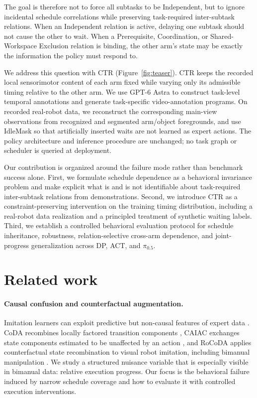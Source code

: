 \documentclass{article}
\newcommand{\method}{CTR}
\begin{document}
The goal is therefore not to force all subtasks to be Independent, but to ignore incidental schedule correlations while preserving task-required inter-subtask relations. When an Independent relation is active, delaying one subtask should not cause the other to wait. When a Prerequisite, Coordination, or Shared-Workspace Exclusion relation is binding, the other arm's state may be exactly the information the policy must respond to.

We address this question with \method{} (Figure~\ref{fig:teaser}). \method{} keeps the recorded local sensorimotor content of each arm fixed while varying only its admissible timing relative to the other arm. We use GPT-6 Astra to construct task-level temporal annotations and generate task-specific video-annotation programs. On recorded real-robot data, we reconstruct the corresponding main-view observations from recognized and segmented arm/object foregrounds, and use IdleMask so that artificially inserted waits are not learned as expert actions. The policy architecture and inference procedure are unchanged; no task graph or scheduler is queried at deployment.

Our contribution is organized around the failure mode rather than benchmark success alone. First, we formulate schedule dependence as a behavioral invariance problem and make explicit what is and is not identifiable about task-required inter-subtask relations from demonstrations. Second, we introduce \method{} as a constraint-preserving intervention on the training timing distribution, including a real-robot data realization and a principled treatment of synthetic waiting labels. Third, we establish a controlled behavioral evaluation protocol for schedule inheritance, robustness, relation-selective cross-arm dependence, and joint-progress generalization across DP, ACT, and $\pi_{0.5}$.

\section{Related work}
\paragraph{Causal confusion and counterfactual augmentation.}
Imitation learners can exploit predictive but non-causal features of expert data \citep{dehaan2019causal}. CoDA recombines locally factored transition components \citep{pitis2020coda}, CAIAC exchanges state components estimated to be unaffected by an action \citep{urpi2024caiac}, and RoCoDA applies counterfactual state recombination to visual robot imitation, including bimanual manipulation \citep{ameperosa2025rocoda}. We study a structured nuisance variable that is especially visible in bimanual data: relative execution progress. Our focus is the behavioral failure induced by narrow schedule coverage and how to evaluate it with controlled execution interventions.
\end{document}
